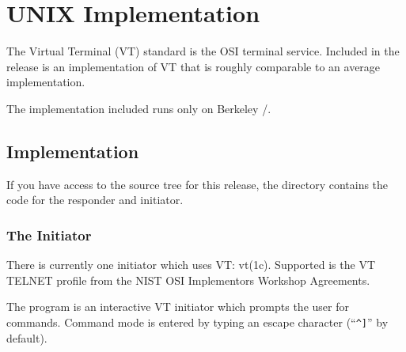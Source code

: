 
\chapter	{UNIX Implementation}\label{unixvt}
The Virtual Terminal (VT) standard is the OSI terminal service.
Included in the release is an implementation of VT that is roughly comparable
to an average  implementation.

The implementation included runs only on Berkeley \unix/.

\section	{Implementation}\label{unixvt:code}
If you have access to the source tree for this release,
the directory  contains the code for the responder and initiator.

\subsection	{The Initiator}
There is currently one initiator which uses VT: \man vt(1c).
Supported is the VT TELNET profile from the NIST OSI Implementors Workshop
Agreements.

The  program is an interactive VT initiator
which prompts the user for commands.
Command mode is entered by typing an escape character
(``\verb"^]"'' by default).


